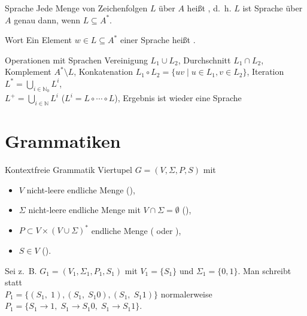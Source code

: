 \begin{Def}{Sprache}
    Jede Menge von Zeichenfolgen $L$ über $A$ heißt
    , d.~h. $L$ ist Sprache über $A$
    genau dann, wenn $L \subseteq A^\ast$.
\end{Def}

\begin{Def}{Wort}
    Ein Element $w \in L \subseteq A^\ast$ einer Sprache heißt .
\end{Def}

\begin{Def}{Operationen mit Sprachen}
    Vereinigung $L_1 \cup L_2$, Durchschnitt $L_1 \cap L_2$, \\
    Komplement $A^\ast \setminus L$,
    Konkatenation $L_1 \circ L_2 = \{uv \;|\;u \in L_1, v \in L_2\}$,
    Iteration $L^\ast = \bigcup_{i \in \mathbb{N}_0} L^i$, \\
    $L^+ = \bigcup_{i \in \mathbb{N}} L^i$ ($L^i = L \circ \cdots \circ L$),
    Ergebnis ist wieder eine Sprache
\end{Def}

\pagebreak

\section{%
    Grammatiken%
}

\begin{Def}{Kontextfreie Grammatik}
    Viertupel $G = (V, \Sigma, P, S)$ mit
    \begin{itemize}
        \item $V$ nicht-leere endliche Menge
        (),

        \item $\Sigma$ nicht-leere endliche Menge mit
        $V \cap \Sigma = \emptyset$ (),

        \item $P \subset V \times (V \cup \Sigma)^\ast$ endliche Menge
        ( oder ),

        \item $S \in V$ ().
    \end{itemize}

    Sei z.~B. $G_1 = (V_1, \Sigma_1, P_1, S_1)$ mit $V_1 = \{S_1\}$ und
    $\Sigma_1 = \{0, 1\}$. Man schreibt statt \\
    $P_1 = \{(S_1,\; 1), (S_1,\; S_{1}0), (S_1,\; S_{1}1)\}$ normalerweise
    $P_1 = \{S_1 \rightarrow 1,\; S_1 \rightarrow S_{1}0,\;
    S_1 \rightarrow S_{1}1\}$.
\end{Def}

